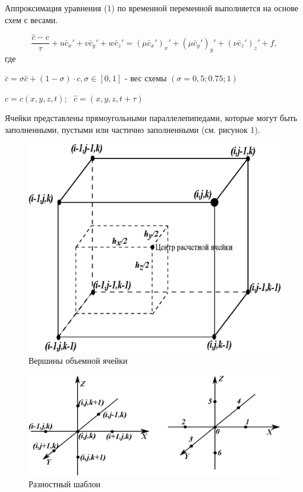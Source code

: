 \documentclass[12pt]{article}
\begin{document}
Аппроксимация уравнения (1) по временной переменной выполняется на основе схем с весами. 

\begin{equation}
	\frac{\hat c - c}{\tau} + u\bar{c}_x' + v\bar{c}_y' + w\bar{c}_z' = (\mu\bar{c}_x')_x' + (\mu\bar{c}_y')_y' + (\nu\bar{c}_z')_z' + f ,		
\end{equation}
где  

$\bar{c} = \sigma\hat c + (1 - \sigma)\cdot c , \sigma \in [0,1] $ - вес схемы $(\sigma = 0,5; 0.75; 1)$

$c=c(x, y, z, t);$ $ $ $\hat c = (x, y, z, t + \tau)  $




Ячейки представлены прямоугольными параллелепипедами, которые могут быть заполненными, пустыми или частично заполненными (см. рисунок 1). 

\begin{figure}[h!]
	\centering
	\includegraphics {figs/ris3}
	\caption{ Вершины объемной ячейки}
\end{figure} 

\begin{figure}[h!]
	\centering
	\includegraphics {figs/shablon}
	\caption{ Разностный шаблон}
\end{figure}
\end{document}
